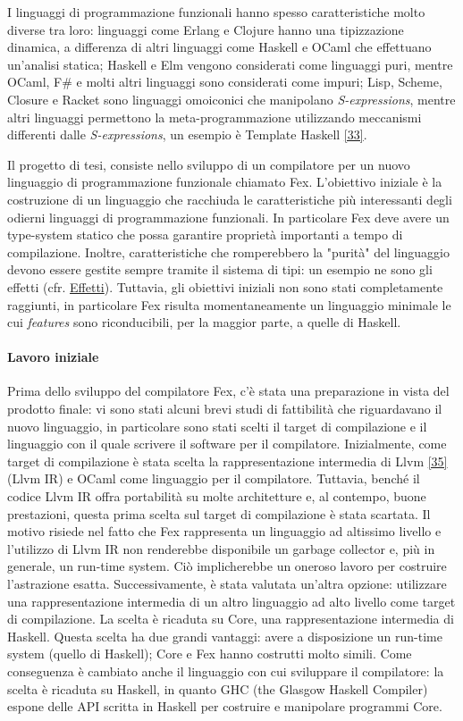 \documentclass[10pt,a4paper]{article}
\begin{document}
I linguaggi di programmazione funzionali hanno spesso caratteristiche molto diverse tra loro: linguaggi come Erlang e
Clojure hanno una tipizzazione dinamica, a differenza di altri linguaggi come Haskell e OCaml che effettuano un'analisi
statica; Haskell e Elm vengono considerati come linguaggi puri, mentre OCaml, F# e molti altri linguaggi sono
considerati come impuri; Lisp, Scheme, Closure e Racket sono linguaggi omoiconici che manipolano \textit{S-expressions},
mentre altri linguaggi permettono la meta-programmazione utilizzando meccanismi differenti dalle \textit{S-expressions}, un
esempio è Template Haskell \hyperlink{bibl33}{[33]}.

Il progetto di tesi, consiste nello sviluppo di un compilatore per un nuovo linguaggio di programmazione
funzionale chiamato Fex. L'obiettivo iniziale è la costruzione di un linguaggio che racchiuda le caratteristiche
più interessanti degli odierni linguaggi di programmazione funzionali. In particolare Fex deve avere
un type-system statico che possa
garantire proprietà importanti a tempo di compilazione. Inoltre, caratteristiche che romperebbero la "purità" del linguaggio
devono essere gestite sempre tramite il sistema di tipi: un esempio ne sono gli effetti (cfr. \hyperlink{Effetti}{Effetti}).
Tuttavia, gli obiettivi iniziali non sono stati completamente raggiunti, in particolare Fex risulta momentaneamente
un linguaggio minimale le cui \textit{features} sono riconducibili, per la maggior parte, a quelle di Haskell.

\paragraph{Lavoro iniziale}
Prima dello sviluppo del compilatore Fex, c'è stata una preparazione in vista del prodotto finale: vi sono stati
alcuni brevi studi di fattibilità che riguardavano il nuovo linguaggio, in particolare sono stati scelti il target
di compilazione e il linguaggio con il quale scrivere il software per il compilatore. Inizialmente, come target di
compilazione è stata scelta la rappresentazione intermedia di Llvm \hyperlink{bibl35}{[35]} (Llvm IR) e OCaml come
linguaggio per il compilatore. Tuttavia, benché il codice Llvm IR offra portabilità su molte architetture e, al contempo,
buone prestazioni, questa prima scelta
sul target di compilazione è stata scartata. Il motivo risiede nel fatto che Fex rappresenta un linguaggio ad altissimo
livello e l'utilizzo di Llvm IR non renderebbe disponibile un garbage collector e, più in generale, un run-time system.
Ciò implicherebbe un oneroso lavoro per costruire l'astrazione esatta.
Successivamente, è stata valutata un'altra opzione: utilizzare una rappresentazione intermedia di un altro linguaggio ad alto
livello come target di compilazione. La scelta è ricaduta su Core, una rappresentazione intermedia di Haskell.
Questa scelta ha due grandi vantaggi: avere a disposizione un run-time system (quello di Haskell); Core e Fex hanno costrutti
molto simili.
Come conseguenza è cambiato anche il linguaggio con cui sviluppare il compilatore: la scelta è ricaduta su Haskell,
in quanto GHC (the Glasgow Haskell Compiler) espone delle API scritta in Haskell per costruire e manipolare
programmi Core.
\end{document}
